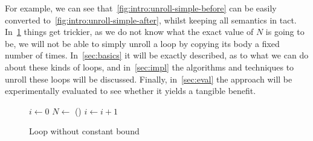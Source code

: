 For example, we can see that~\cref{fig:intro:unroll-simple-before} can be easily converted to~\cref{fig:intro:unroll-simple-after}, whilst keeping all semantics in tact.
In~\cref{fig:intro:unroll-nostatic-bound} things get trickier, as we do not know what the exact value of $N$ is going to be, we will not be able to simply unroll a loop by copying its body a fixed number of times.
In~\cref{sec:basics} it will be exactly described, as to what we can do about these kinds of loops, and in~\cref{sec:impl} the algorithms and techniques to unroll these loops will be discussed.
Finally, in~\cref{sec:eval} the approach will be experimentally evaluated to see whether it yields a tangible benefit.
\begin{figure}[h]
    \begin{algorithmic}
        \State $i \gets 0$
        \State $N \gets$ () 
            \State {}
            \State $i \gets i + 1$
        \EndWhile
    \end{algorithmic}
    \caption{Loop without constant bound}
    \label{fig:intro:unroll-nostatic-bound}
\end{figure}

